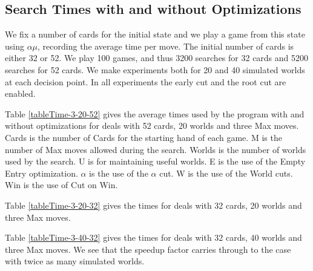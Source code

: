 \documentclass[letterpaper]{article} %
\begin{document}
\subsection{Search Times with and without Optimizations}




We fix a number of cards for the initial state and we play a game from this state using $\alpha\mu$, recording the average time per move. The initial number of cards is either 32 or 52. We play 100 games, and thus 3200 searches for 32 cards and 5200 searches for 52 cards. We make experiments both for 20 and 40 simulated worlds at each decision point. In all experiments the early cut and the root cut are enabled.

Table \ref{tableTime-3-20-52} gives the average times used by the program with and without optimizations for deals with 52 cards, 20 worlds and three Max moves. Cards is the number of Cards for the starting hand of each game. M is the number of Max moves allowed during the search. Worlds is the number of worlds used by the search. U is for maintaining useful worlds. E is the use of the Empty Entry optimization. $\alpha$ is the use of the $\alpha$ cut. W is the use of the World cuts. Win is the use of Cut on Win.

Table \ref{tableTime-3-20-32} gives the times for deals with 32 cards, 20 worlds and three Max moves.

Table \ref{tableTime-3-40-32} gives the times for deals with 32 cards, 40 worlds and three Max moves. We see that the speedup factor carries through to the case with twice as many simulated worlds.




\end{document}
